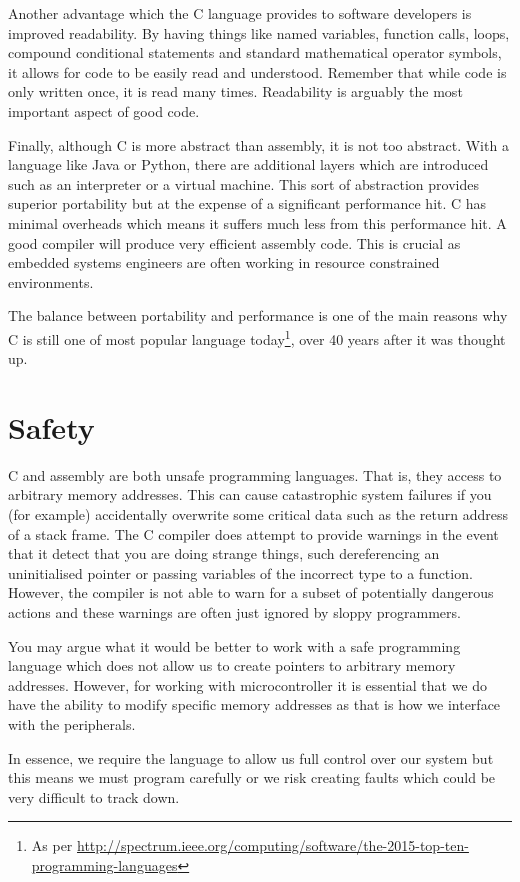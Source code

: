 Another advantage which the C language provides to software developers is improved readability. 
By having things like named variables, function calls, loops, compound conditional statements and standard mathematical operator symbols, it allows for code to be easily read and understood. 
Remember that while code is only written once, it is read many times. Readability is arguably the most important aspect of good code.

Finally, although C is more abstract than assembly, it is not too abstract. With a language like Java or Python, there are additional layers which are introduced such as an interpreter or a virtual machine. This sort of abstraction provides superior portability but at the expense of a significant performance hit. C has minimal overheads which means it suffers much less from this performance hit.
A good compiler will produce very efficient assembly code.
This is  crucial as embedded systems engineers are often working in resource constrained environments.

The balance between portability and performance is one of the main reasons why C is still one of most popular language today\footnote{As per \url{http://spectrum.ieee.org/computing/software/the-2015-top-ten-programming-languages}}, over 40 years after it was thought up. 

\section{Safety}
C and assembly are both unsafe programming languages. That is, they access to arbitrary memory addresses. This can cause catastrophic system failures if you (for example) accidentally overwrite some critical data such as the return address of a stack frame.
The C compiler does attempt to provide warnings in the event that it detect that you are doing strange things, such dereferencing an uninitialised pointer or passing variables of the incorrect type to a function. However, the compiler is not able to warn for a subset of potentially dangerous actions and these warnings are often just ignored by sloppy programmers. 

You may argue what it would be better to work with a safe programming language which does not allow us to create pointers to arbitrary memory addresses. However, for working with microcontroller it is essential that we do have the ability to modify specific memory addresses as that is how we interface with the peripherals. 

In essence, we require the language to allow us full control over our system but this means we must program carefully or we risk creating faults which could be very difficult to track down.


